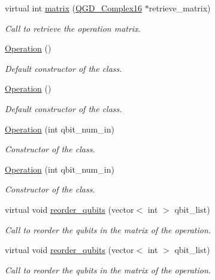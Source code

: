 \begin{DoxyCompactItemize}
virtual int \hyperlink{class_operation_aabfd51f93aa6855b27d434b8a43ee4aa}{matrix} (\hyperlink{struct_q_g_d___complex16}{Q\+G\+D\+\_\+\+Complex16} $\ast$retrieve\+\_\+matrix)
\begin{DoxyCompactList}\small\item\em Call to retrieve the operation matrix. \end{DoxyCompactList}\item 
\hyperlink{class_operation_a55f76bcb8990f4dba577990af0c8399e}{Operation} ()
\begin{DoxyCompactList}\small\item\em Default constructor of the class. \end{DoxyCompactList}\item 
\hyperlink{class_operation_a55f76bcb8990f4dba577990af0c8399e}{Operation} ()
\begin{DoxyCompactList}\small\item\em Default constructor of the class. \end{DoxyCompactList}\item 
\hyperlink{class_operation_a22ab12ef9cdb3234e6ad9656d9dfa9ce}{Operation} (int qbit\+\_\+num\+\_\+in)
\begin{DoxyCompactList}\small\item\em Constructor of the class. \end{DoxyCompactList}\item 
\hyperlink{class_operation_a22ab12ef9cdb3234e6ad9656d9dfa9ce}{Operation} (int qbit\+\_\+num\+\_\+in)
\begin{DoxyCompactList}\small\item\em Constructor of the class. \end{DoxyCompactList}\item 
virtual void \hyperlink{class_operation_a73a8408873507d5630f57c200915a0c0}{reorder\+\_\+qubits} (vector$<$ int $>$ qbit\+\_\+list)
\begin{DoxyCompactList}\small\item\em Call to reorder the qubits in the matrix of the operation. \end{DoxyCompactList}\item 
virtual void \hyperlink{class_operation_adc9e17e2a576bb413177eb729e3373bc}{reorder\+\_\+qubits} (vector$<$ int $>$ qbit\+\_\+list)
\begin{DoxyCompactList}\small\item\em Call to reorder the qubits in the matrix of the operation. \end{DoxyCompactList}\item 

\end{DoxyCompactItemize}
